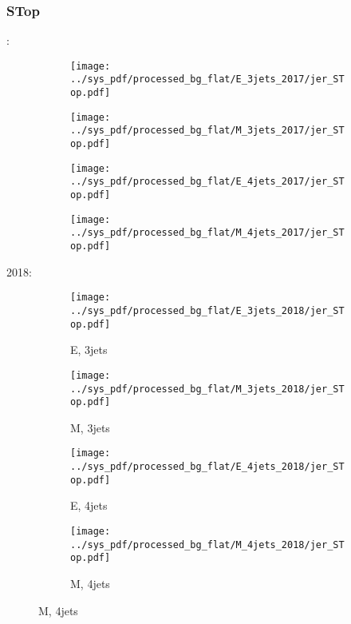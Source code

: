 \documentclass{beamer}
\begin{document}
\begin{frame}
\frametitle{STop}
\fontsize{5}{1}:
\begin{figure}
\centering
\begin{subfigure}[b]{0.24\textwidth}
\texttt{[image: ../sys\_pdf/processed\_bg\_flat/E\_3jets\_2017/jer\_STop.pdf]}
\end{subfigure}
\begin{subfigure}[b]{0.24\textwidth}
\texttt{[image: ../sys\_pdf/processed\_bg\_flat/M\_3jets\_2017/jer\_STop.pdf]}
\end{subfigure}
\begin{subfigure}[b]{0.24\textwidth}
\texttt{[image: ../sys\_pdf/processed\_bg\_flat/E\_4jets\_2017/jer\_STop.pdf]}
\end{subfigure}
\begin{subfigure}[b]{0.24\textwidth}
\texttt{[image: ../sys\_pdf/processed\_bg\_flat/M\_4jets\_2017/jer\_STop.pdf]}
\end{subfigure}
\end{figure}
2018:
\begin{figure}
\centering
\begin{subfigure}[b]{0.24\textwidth}
\texttt{[image: ../sys\_pdf/processed\_bg\_flat/E\_3jets\_2018/jer\_STop.pdf]}
\captionsetup{font=tiny}
\caption{E, 3jets}
\end{subfigure}
\begin{subfigure}[b]{0.24\textwidth}
\texttt{[image: ../sys\_pdf/processed\_bg\_flat/M\_3jets\_2018/jer\_STop.pdf]}
\captionsetup{font=tiny}
\caption{M, 3jets}
\end{subfigure}
\begin{subfigure}[b]{0.24\textwidth}
\texttt{[image: ../sys\_pdf/processed\_bg\_flat/E\_4jets\_2018/jer\_STop.pdf]}
\captionsetup{font=tiny}
\caption{E, 4jets}
\end{subfigure}
\begin{subfigure}[b]{0.24\textwidth}
\texttt{[image: ../sys\_pdf/processed\_bg\_flat/M\_4jets\_2018/jer\_STop.pdf]}
\captionsetup{font=tiny}
\caption{M, 4jets}
\end{subfigure}
\end{figure}
\end{frame}
\end{document}
